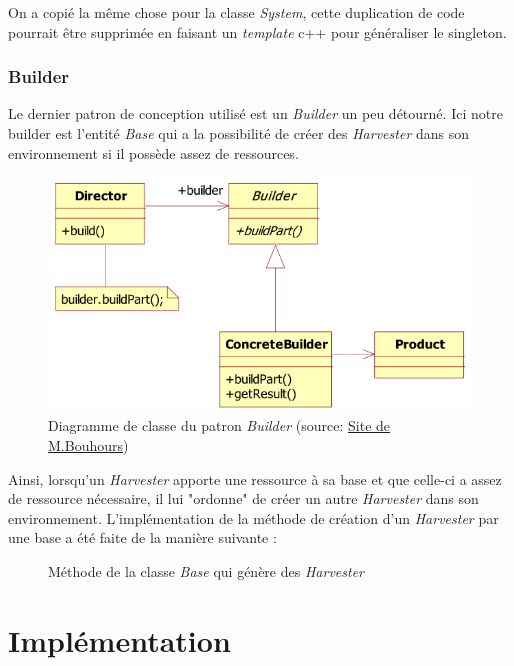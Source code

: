\documentclass[a4paper, 12pt]{article}
\begin{document}
On a copié la même chose pour la classe \emph{System}, cette duplication de code pourrait
être supprimée en faisant un \emph{template} c++ pour généraliser le singleton.

\subsubsection{Builder}
Le dernier patron de conception utilisé est un \emph{Builder} un peu détourné. Ici notre builder est l'entité \emph{Base} qui
a la possibilité de créer des \emph{Harvester} dans son environnement si il possède assez de ressources.

\begin{figure}[!h]
  \centering
  \caption{Diagramme de classe du patron \emph{Builder} (source: \href{http://www.goprod.bouhours.net/?page=pattern&pat_id=4}{Site de M.Bouhours})}
  \includegraphics[scale=0.6]{img/builder.png}
\end{figure}

Ainsi, lorsqu'un \emph{Harvester} apporte une ressource à sa base et que celle-ci a assez de ressource nécessaire, il lui "ordonne" de
créer un autre \emph{Harvester} dans son environnement. L'implémentation de la méthode de création d'un \emph{Harvester} par une base
a été faite de la manière suivante :
\begin{figure}[!h]
  \centering
  \caption{Méthode de la classe \emph{Base} qui génère des \emph{Harvester}}
  
\end{figure}



\newpage
\section{Implémentation}
\end{document}
